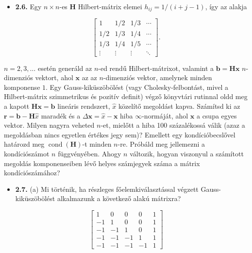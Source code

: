 \documentclass[
  magyar,
  11pt]{article}
\providecommand{\tightlist}{%
  \setlength{\itemsep}{0pt}\setlength{\parskip}{0pt}}
\providecommand{\boldsymbol}[1]{\mathbf{#1}}
\begin{document}
\begin{itemize}
\tightlist
\item
  \textbf{2.6.} Egy \(n \times n\)-es \(\boldsymbol{H}\) Hilbert-mátrix
  elemei \(h_{ij} = 1/(i+j-1)\), így az alakja
\end{itemize}

\[\begin{bmatrix} 1 & 1/2 & 1/3 & \cdots \\ 1/2 & 1/3 & 1/4 & \cdots \\ 1/3 & 1/4 & 1/5 & \cdots \\ \vdots & \vdots & \vdots & \ddots \end{bmatrix}.\]

\(n = 2, 3, \ldots\) esetén generáld az \(n\)-ed rendű Hilbert-mátrixot,
valamint a \(\boldsymbol{b} = \boldsymbol{H}\boldsymbol{x}\)
\(n\)-dimenziós vektort, ahol \(\boldsymbol{x}\) az az \(n\)-dimenziós
vektor, amelynek minden komponense \(1\). Egy Gauss-kiküszöbölést (vagy
Cholesky-felbontást, mivel a Hilbert-mátrix szimmetrikus és pozitív
definit) végző könyvtári rutinnal oldd meg a kapott
\(\boldsymbol{H}\boldsymbol{x} = \boldsymbol{b}\) lineáris rendszert,
\(\hat{x}\) közelítő megoldást kapva. Számítsd ki az
\(\mathbf{r} = \mathbf{b} - \mathbf{H}\hat{x}\) maradék és a
\(\Delta \mathbf{x} = \hat{x} - \mathbf{x}\) hiba \(\infty\)-normáját,
ahol \(\mathbf{x}\) a csupa egyes vektor. Milyen nagyra veheted
\(n\)-et, mielőtt a hiba 100 százalékossá válik (azaz a megoldásban
nincs egyetlen értékes jegy sem)? Emellett egy kondícióbecslővel
határozd meg \(\operatorname{cond}(\boldsymbol{H})\)-t minden \(n\)-re.
Próbáld meg jellemezni a kondíciószámot \(n\) függvényében. Ahogy \(n\)
változik, hogyan viszonyul a számított megoldás komponenseiben lévő
helyes számjegyek száma a mátrix kondíciószámához?

\begin{itemize}
\tightlist
\item
  \textbf{2.7.} (a) Mi történik, ha részleges főelemkiválasztással
  végzett Gauss-kiküszöbölést alkalmazunk a következő alakú mátrixra?
\end{itemize}

\[\begin{bmatrix}
1 & 0 & 0 & 0 & 1 \\
-1 & 1 & 0 & 0 & 1 \\
-1 & -1 & 1 & 0 & 1 \\
-1 & -1 & -1 & 1 & 1 \\
-1 & -1 & -1 & -1 & 1
\end{bmatrix}\]
\end{document}
